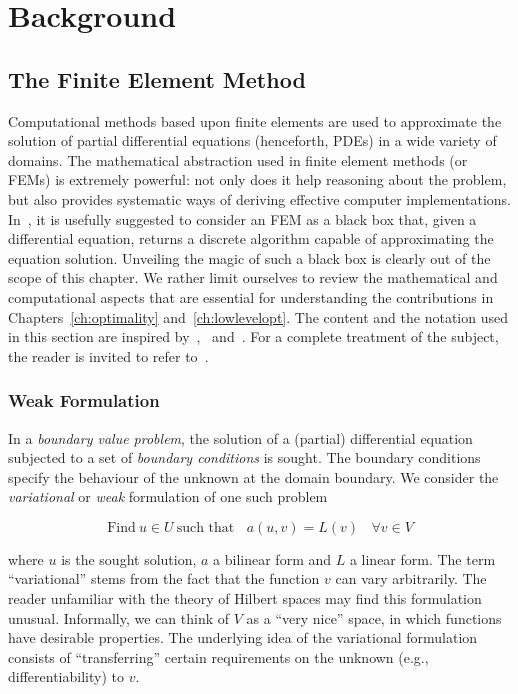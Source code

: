 \chapter{Background}
\label{ch:background}

\section{The Finite Element Method}
\label{sec:bkg:fem}
Computational methods based upon finite elements are used to approximate the solution of partial differential equations (henceforth, PDEs) in a wide variety of domains. The mathematical abstraction used in finite element methods (or FEMs) is extremely powerful: not only does it help reasoning about the problem, but also provides systematic ways of deriving effective computer implementations. In~\cite{brenner-and-scott}, it is usefully suggested to consider an FEM as a black box that, given a differential equation, returns a discrete algorithm capable of approximating the equation solution. Unveiling the magic of such a black box is clearly out of the scope of this chapter. We rather limit ourselves to review the mathematical and computational aspects that are essential for understanding the contributions in Chapters~\ref{ch:optimality} and~\ref{ch:lowlevelopt}. The content and the notation used in this section are inspired by~\cite{florian-thesis},~\cite{Fenics} and~\cite{quadrature-olegaard}. For a complete treatment of the subject, the reader is invited to refer to~\cite{brenner-and-scott}.



\subsection{Weak Formulation}
\label{sec:bkg:var-problems}
In a {\em boundary value problem}, the solution of a (partial) differential equation subjected to a set of {\em boundary conditions} is sought. The boundary conditions specify the behaviour of the unknown at the domain boundary. We consider the {\em variational} or {\em weak} formulation of one such problem

\begin{equation}
\text{Find}\ u \in U\ \text{such that}\ \ \ \ a(u, v) = L(v)\ \ \ \ \forall v \in V
\end{equation}

where $u$ is the sought solution, $a$ a bilinear form and $L$ a linear form. The term ``variational'' stems from the fact that the function $v$ can vary arbitrarily. The reader unfamiliar with the theory of Hilbert spaces may find this formulation unusual. Informally, we can think of $V$ as a ``very nice'' space, in which functions have desirable properties. The underlying idea of the variational formulation consists of ``transferring'' certain requirements on the unknown (e.g., differentiability) to $v$. 

